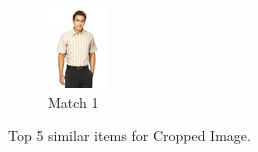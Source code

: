 \begin{figure}[H]
\begin{subfigure}[b]{0.19\textwidth}
      \includegraphics[width=\textwidth]{images/2output5.jpeg}
      \caption{Match 1}
  \end{subfigure}
  \caption{Top 5 similar items for Cropped Image.}
  \label{fig:similar_items_1}
\end{figure}

